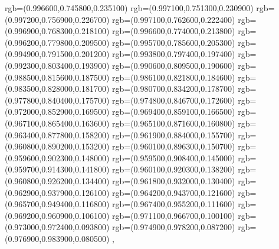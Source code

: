 {{		 rgb=(0.996600,0.745800,0.235100)
		 rgb=(0.997100,0.751300,0.230900)
		 rgb=(0.997200,0.756900,0.226700)
		 rgb=(0.997100,0.762600,0.222400)
		 rgb=(0.996900,0.768300,0.218100)
		 rgb=(0.996600,0.774000,0.213800)
		 rgb=(0.996200,0.779800,0.209500)
		 rgb=(0.995700,0.785600,0.205300)
		 rgb=(0.994900,0.791500,0.201200)
		 rgb=(0.993800,0.797400,0.197400)
		 rgb=(0.992300,0.803400,0.193900)
		 rgb=(0.990600,0.809500,0.190600)
		 rgb=(0.988500,0.815600,0.187500)
		 rgb=(0.986100,0.821800,0.184600)
		 rgb=(0.983500,0.828000,0.181700)
		 rgb=(0.980700,0.834200,0.178700)
		 rgb=(0.977800,0.840400,0.175700)
		 rgb=(0.974800,0.846700,0.172600)
		 rgb=(0.972000,0.852900,0.169500)
		 rgb=(0.969400,0.859100,0.166500)
		 rgb=(0.967100,0.865400,0.163600)
		 rgb=(0.965100,0.871600,0.160800)
		 rgb=(0.963400,0.877800,0.158200)
		 rgb=(0.961900,0.884000,0.155700)
		 rgb=(0.960800,0.890200,0.153200)
		 rgb=(0.960100,0.896300,0.150700)
		 rgb=(0.959600,0.902300,0.148000)
		 rgb=(0.959500,0.908400,0.145000)
		 rgb=(0.959700,0.914300,0.141800)
		 rgb=(0.960100,0.920300,0.138200)
		 rgb=(0.960800,0.926200,0.134400)
		 rgb=(0.961800,0.932000,0.130400)
		 rgb=(0.962900,0.937900,0.126100)
		 rgb=(0.964200,0.943700,0.121600)
		 rgb=(0.965700,0.949400,0.116800)
		 rgb=(0.967400,0.955200,0.111600)
		 rgb=(0.969200,0.960900,0.106100)
		 rgb=(0.971100,0.966700,0.100100)
		 rgb=(0.973000,0.972400,0.093800)
		 rgb=(0.974900,0.978200,0.087200)
		 rgb=(0.976900,0.983900,0.080500)
	 },
}